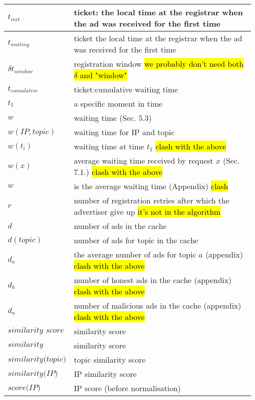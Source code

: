 \begin{table*}
\begin{center}
\begin{tabular}{ | l | p{16cm} |}
        $t_{\textit{init}}$ & ticket: the local time at the registrar when the ad was received for the first time \\ \hline
        $t_{\textit{waiting}}$ & ticket the local time at the registrar when the ad was received for the first time \\ \hline
        $\delta t_{\textit{window}}$ & registration window \hl{we probably don't need both $\delta$ and "window"} \\ \hline
        $t_{\textit{cumulative}}$ & ticket:cumulative waiting time \\ \hline
        $t_1$ & a specific moment in time \\ \hline
        $w$ & waiting time (Sec. 5.3) \\ \hline
        $w(\textit{IP}, \textit{topic})$ & waiting time for IP and topic \\ \hline
        $w(t_i)$ & waiting time at time $t_1$ \hl{clash with the above} \\ \hline
        $w(x)$ & average waiting time received by request $x$ (Sec. 7.1.) \hl{clash with the above} \\ \hline
        $w$ & is the average waiting time (Appendix) \hl{clash} \\ \hline
        $r$ & number of registration retries after which the advertiser give up \hl{it's not in the algorithm} \\ \hline
        $d$ & number of ads in the cache \\ \hline
        $d(\textit{topic})$ & number of ads for topic in the cache \\ \hline
        $d_a$ & the average number of ads for topic $a$ (appendix) \hl{clash with the above} \\ \hline
        $d_h$ & number of honest ads in the cache (appendix) \hl{clash with the above} \\ \hline
        $d_a$ & number of malicious ads in the cache (appendix) \hl{clash with the above} \\ \hline
        $\textit{similarity score}$ & similarity score \\ \hline
        $\textit{similarity}$ & similarity score \\ \hline
        $\textit{similarity(topic)}$ & topic similarity score \\ \hline
        $\textit{similarity(IP)}$ & IP similarity score \\ \hline
        $\textit{score(IP)}$ & IP score (before normalisation) \\ \hline

\end{tabular}
\end{center}
\end{table*}
